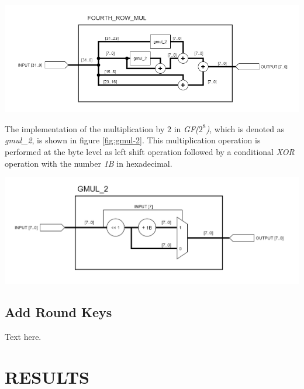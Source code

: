 \documentclass[a4paper, 10pt]{article}
\newenvironment{Figure}
    {\par\medskip\noindent\minipage{\linewidth}}
    {\endminipage\par\medskip}
\begin{document}
\begin{multicols}{2}
            \noindent
            \begin{Figure}
                \centering
                \includegraphics[width=\linewidth]{Fourth_Row_Mul.png}
                \label{fig:fourth-row-mul}
            \end{Figure}

            The implementation of the multiplication by 2 in \textit{GF($2^{8}$)}, which is denoted as \textit{gmul\_2}, is shown in figure \ref{fig:gmul-2}. This multiplication operation is performed at the byte level as left shift operation followed by a conditional \textit{XOR} operation with the number \textit{1B} in hexadecimal.

            \noindent
            \begin{Figure}
                \centering
                \includegraphics[width=\linewidth]{gmul_2.png}
                \label{fig:gmul-2}
            \end{Figure}

            \subsection{Add Round Keys}

            Text here.

        \section{RESULTS}


\end{multicols}
\end{document}
